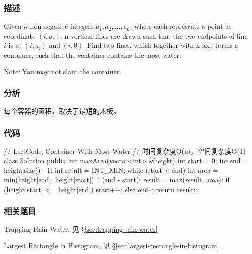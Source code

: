 \subsubsection{描述}
Given $n$ non-negative integers $a_1, a_2, ..., a_n$, where each represents a point at coordinate $(i, a_i)$. n vertical lines are drawn such that the two endpoints of line $i$ is at $(i, a_i)$ and $(i, 0)$. Find two lines, which together with x-axis forms a container, such that the container contains the most water.

Note: You may not slant the container.


\subsubsection{分析}
每个容器的面积，取决于最短的木板。


\subsubsection{代码}
\begin{Code}
// LeetCode, Container With Most Water
// 时间复杂度O(n)，空间复杂度O(1)
class Solution {
public:
    int maxArea(vector<int> &height) {
        int start = 0;
        int end = height.size() - 1;
        int result = INT_MIN;
        while (start < end) {
            int area = min(height[end], height[start]) * (end - start);
            result = max(result, area);
            if (height[start] <= height[end]) {
                start++;
            } else {
                end--;
            }
        }
        return result;
    }
};
\end{Code}


\subsubsection{相关题目}
\begindot
\item Trapping Rain Water, 见 \S \ref{sec:trapping-rain-water}
\item Largest Rectangle in Histogram, 见 \S \ref{sec:largest-rectangle-in-histogram}
\myenddot
